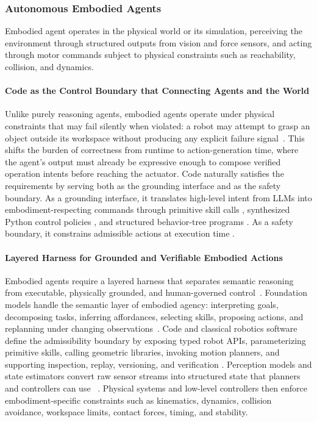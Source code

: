 \subsubsection{Autonomous Embodied Agents}

Embodied agent operates in the physical world or its simulation, perceiving the environment through structured outputs from vision and force sensors, and acting through motor commands subject to physical constraints such as reachability, collision, and dynamics.

\paragraph{Code as the Control Boundary that Connecting Agents and the World}
Unlike purely reasoning agents, embodied agents operate under physical constraints that may fail silently when violated: a robot may attempt to grasp an object outside its workspace without producing any explicit failure signal~\citep{liang2023codepolicieslanguagemodel}. This shifts the burden of correctness from runtime to action-generation time, where the agent's output must already be expressive enough to compose verified operation intents before reaching the actuator. 
Code naturally satisfies the requirements by serving both as the grounding interface and as the safety boundary. As a grounding interface, it translates high-level intent from LLMs into embodiment-respecting commands through primitive skill calls \citep{ahn2022can, ren2023robots, zhai2026skillvla, zhang2023bootstrap}, synthesized Python control policies \citep{liang2023code, mu2024robocodex, xie2025robotic, wang2025llm, ji2026genswarm}, and structured behavior-tree programs \citep{zhang2025codebt}. As a safety boundary, it constrains admissible actions at execution time \citep{guan2025normcode, szeider2025cp, miculicich2025veriguard}.

\paragraph{Layered Harness for Grounded and Verifiable Embodied Actions} 
Embodied agents require a layered harness that separates semantic reasoning from executable, physically grounded, and human-governed control~\citep{vemprala2024chatgpt}. Foundation models handle the semantic layer of embodied agency: interpreting goals, decomposing tasks, inferring affordances, selecting skills, proposing actions, and replanning under changing observations~\citep{huang2022inner, wang2023voyager}.  Code and classical robotics software define the admissibility boundary by exposing typed robot APIs, parameterizing primitive skills, calling geometric libraries, invoking motion planners, and supporting inspection, replay, versioning, and verification \citep{xie2025robotic, liang2023code, huang2023voxposer, macenski2020nav2}. Perception models and state estimators convert raw sensor streams into structured state that planners and controllers can use ~\citep{driess2023palme, deepmind2025geminirobotics}. Physical systems and low-level controllers then enforce embodiment-specific constraints such as kinematics, dynamics, collision avoidance, workspace limits, contact forces, timing, and stability. 

